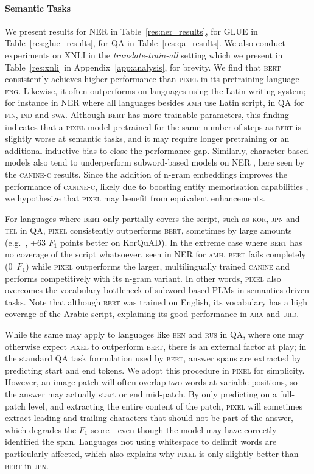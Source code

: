 \documentclass{article}
\newcommand{\model}{\textsc{pixel}\xspace}
\newcommand{\arabi}{\textsc{ara}\xspace}
\newcommand{\english}{\textsc{eng}\xspace}
\newcommand{\japanese}{\textsc{jpn}\xspace}
\newcommand{\korean}{\textsc{kor}\xspace}
\newcommand{\amharic}{\textsc{amh}\xspace}
\newcommand{\swahili}{\textsc{swa}\xspace}
\newcommand{\russian}{\textsc{rus}\xspace}
\newcommand{\urdu}{\textsc{urd}\xspace}
\newcommand{\bengali}{\textsc{ben}\xspace}
\newcommand{\finnish}{\textsc{fin}\xspace}
\newcommand{\indonesian}{\textsc{ind}\xspace}
\newcommand{\telugu}{\textsc{tel}\xspace}
\begin{document}
\paragraph{Semantic Tasks} We present results for NER in Table~\ref{res:ner_results}, for GLUE in Table~\ref{res:glue_results}, for QA in Table~\ref{res:qa_results}.
We also conduct experiments on XNLI in the \emph{translate-train-all} setting which we present in Table~\ref{res:xnli} in Appendix~\ref{app:analysis}, for brevity.
We find that \textsc{bert} consistently achieves higher performance than \model in its pretraining language \english. Likewise, it often outperforms on languages using the Latin writing system; for instance in NER where all languages besides \amharic use Latin script, in QA for \finnish, \indonesian and \swahili.
Although \textsc{bert} has more trainable parameters, this finding indicates that a \model model pretrained for the same number of steps as \textsc{bert} is slightly worse at semantic tasks, and it may require longer pretraining or an additional inductive bias to close the performance gap. 
Similarly, character-based models also tend to underperform subword-based models on NER \citep{keren-etal-2022-breaking}, here seen by the \textsc{canine-c} results.
Since the addition of n-gram embeddings improves the performance of \textsc{canine-c}, likely due to boosting entity memorisation capabilities \citep{DBLP:journals/tacl/ClarkGTW22}, we hypothesize that \model may benefit from equivalent enhancements.


For languages where \textsc{bert} only partially covers the script, such as \korean, \japanese and \telugu in QA,
\model consistently outperforms \textsc{bert}, sometimes by large amounts (e.g.\ , +63 $F_1$ points better on KorQuAD). In the extreme case where \textsc{bert} has no coverage of the script whatsoever, seen in NER for \amharic, \textsc{bert} fails completely (0~$F_1$) while \model outperforms the larger, multilingually trained \textsc{canine} and performs competitively with its n-gram variant. In other words, \model also overcomes the vocabulary bottleneck of subword-based PLMs in semantics-driven tasks.
Note that although \textsc{bert} was trained on English, its vocabulary has a high coverage of the Arabic script, explaining its good performance in \arabi and \urdu.\footnotemark

While the same may apply to languages like \bengali and \russian in QA, where one may otherwise expect \model to outperform \textsc{bert}, there is an external factor at play; in the standard QA task formulation used by \textsc{bert}, answer spans are extracted by predicting start and end tokens. We adopt this procedure in \model for simplicity. However, an image patch will often overlap two words at variable positions, so the answer may actually start or end mid-patch. By only predicting on a full-patch level, and extracting the entire content of the patch, \model will sometimes extract leading and trailing characters that should not be part of the answer, which degrades the $F_1$ score---even though the model may have correctly identified the span. Languages not using whitespace to delimit words are particularly affected, which also explains why \model is only slightly better than \textsc{bert} in \japanese.
\end{document}

